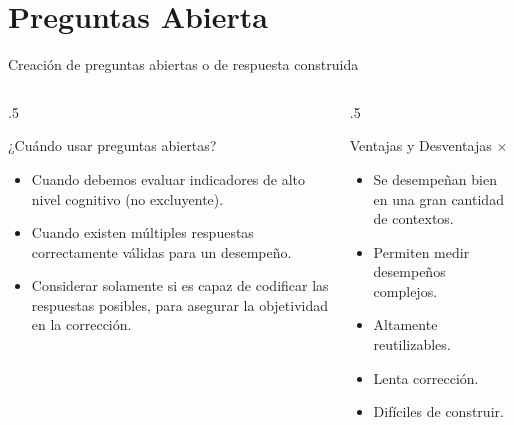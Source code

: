 \documentclass[11pt, aspectratio=169, xcolor=table,hyphens]{beamer}
\begin{document}
\section{Preguntas  Abierta}
\begin{frame}{Creación de preguntas abiertas o de respuesta construida}
	\begin{columns}
		\begin{column}{.5\linewidth}
			\begin{block}{¿Cuándo usar preguntas abiertas?}
				\begin{itemize}[<+->]
					\justifying
					\item Cuando debemos evaluar indicadores de alto nivel cognitivo (no excluyente).
					\item Cuando existen múltiples respuestas correctamente válidas para un desempeño.
					\item Considerar solamente si es capaz de codificar las respuestas posibles, para asegurar la objetividad en la corrección.
				\end{itemize}
			\end{block}
		\end{column}
		\begin{column}{.5\linewidth}
			\begin{block}{Ventajas \checkmark y Desventajas $\times$}
				\begin{itemize}
					\item[\checkmark]<4-> Se desempeñan bien en una gran cantidad de contextos.
					\item[\checkmark]<5-> Permiten medir desempeños complejos.
					\item[\checkmark]<6-> Altamente reutilizables.
					\item[$\times$]<7-> Lenta corrección.
					\item[$\times$]<8-> Difíciles de construir.
				\end{itemize}
			\end{block}
		\end{column}
	\end{columns}
\end{frame}
\end{document}

